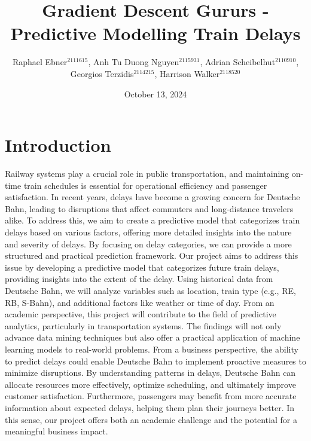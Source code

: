 \documentclass[a4paper,oneside,bibliography=totoc]{scrbook}
\begin{document}
\frontmatter \subject{Data Mining Project Outline HWS24} %
\title{Gradient Descent Gururs - Predictive Modelling Train Delays}
\author{Raphael Ebner$^{2111615}$, Anh Tu Duong Nguyen$^{2115931}$, Adrian Scheibelhut$^{2110910}$,\\ Georgios Terzidis$^{2114215}$, Harrison Walker$^{2118520}$} \date{October 13, 2024}
\publishers{{\small Submitted to}\\
Data and Web Science Group\\
Prof.\ Dr.\ Hertling\\
University of Mannheim\\}

\maketitle

\mainmatter
\chapter{Introduction}
\label{ch:intro}
Railway systems play a crucial role in public transportation, and maintaining on-time train schedules is essential for operational efficiency and passenger satisfaction. In recent years, delays have become a growing concern for Deutsche Bahn, leading to disruptions that affect commuters and long-distance travelers alike. To address this, we aim to create a predictive model that categorizes train delays based on various factors, offering more detailed insights into the nature and severity of delays. By focusing on delay categories, we can provide a more structured and practical prediction framework.
Our project aims to address this issue by developing a predictive model that categorizes future train delays, providing insights into the extent of the delay. Using historical data from Deutsche Bahn, we will analyze variables such as location, train type (e.g., RE, RB, S-Bahn), and additional factors like weather or time of day. From an academic perspective, this project will contribute to the field of predictive analytics, particularly in transportation systems. The findings will not only advance data mining techniques but also offer a practical application of machine learning models to real-world problems.
From a business perspective, the ability to predict delays could enable Deutsche Bahn to implement proactive measures to minimize disruptions. By understanding patterns in delays, Deutsche Bahn can allocate resources more effectively, optimize scheduling, and ultimately improve customer satisfaction. Furthermore, passengers may benefit from more accurate information about expected delays, helping them plan their journeys better. In this sense, our project offers both an academic challenge and the potential for a meaningful business impact.
\end{document}

